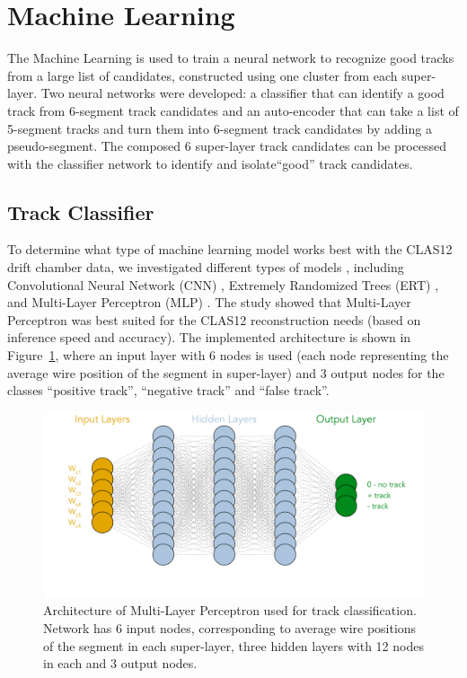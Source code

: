 \section{Machine Learning}

The Machine Learning is used to train a neural network to recognize good tracks
 from a large list of candidates, constructed using one cluster from each super-layer.
 Two neural networks were developed: a classifier that can identify a good track from  
 6-segment track candidates  and an auto-encoder that can take a list of 5-segment tracks 
 and turn them into 6-segment track candidates by adding a pseudo-segment. The composed 
 6 super-layer track candidates can be processed with the classifier network to identify and 
 isolate``good'' track candidates.


 
 \subsection{Track Classifier}
 
 To determine what type of machine learning model works best with the CLAS12 drift chamber data, 
 we investigated different types of models  \cite{Gavalian:2020oxg}, including Convolutional Neural 
 Network (CNN) , Extremely Randomized Trees (ERT) \cite{scikitlearn-extratreesclassifier}, and 
 Multi-Layer Perceptron (MLP) \cite{scikitlearn-mlpclassifier}. The study showed that Multi-Layer 
 Perceptron was best suited for the CLAS12 reconstruction needs (based on inference speed and accuracy). 
 The implemented architecture is shown in Figure~\ref{mlp:architecture}, where an input layer with 6 
 nodes is used (each node representing the average wire position of the segment in super-layer) and 3 
 output nodes for the classes ``positive track'', ``negative track'' and ``false track''.
 
 \begin{figure}[!ht]
\begin{center}
  \includegraphics[width=4.5in]{images/mlp_diagram.pdf}
\caption {Architecture of Multi-Layer Perceptron used for track classification. Network has 6 input nodes,
corresponding to average wire positions of the segment in each super-layer, three hidden layers with 12 nodes 
in each and 3 output nodes.}
 \label{mlp:architecture}
 \end{center}
\end{figure}

